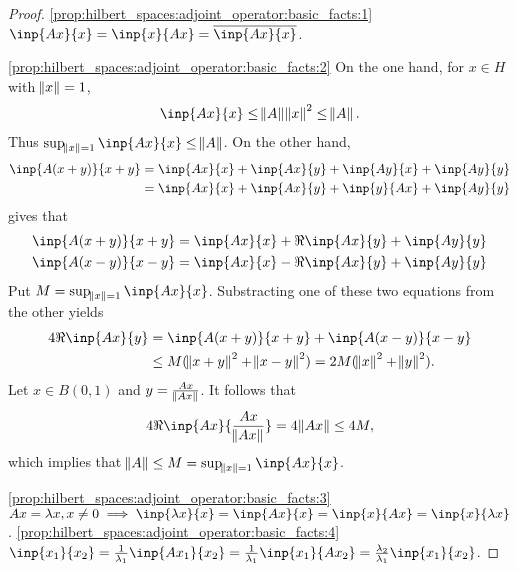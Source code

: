 \begin{proof}
\ref{prop:hilbert_spaces:adjoint_operator:basic_facts:1}
$\inp{Ax}{x} = \inp{x}{Ax} = \conj{\inp{Ax}{x}}$. 

\ref{prop:hilbert_spaces:adjoint_operator:basic_facts:2}
On the one hand, for $x \in H$ with $\norm{x} = 1$, 
\begin{equation*}
    \begin{aligned}
        \inp{Ax}{x} \le \norm{A} \norm{x}^2 \le \norm{A}. 
    \end{aligned}
\end{equation*}
Thus $\sup_{\norm{x} = 1} \inp{Ax}{x} \le \norm{A}$. 
On the other hand, 
\begin{equation}
    \begin{aligned}
        \inp{A(x + y)}{x + y} 
        &= \inp{Ax}{x} + \inp{Ax}{y} + \inp{Ay}{x} + \inp{Ay}{y} \\
        &= \inp{Ax}{x} + \inp{Ax}{y} + \inp{y}{Ax} + \inp{Ay}{y} 
    \end{aligned}
\end{equation}
gives that 
\begin{align}
    \inp{A(x + y)}{x + y} = \inp{Ax}{x} + \Re\inp{Ax}{y} + \inp{Ay}{y} \\
    \inp{A(x - y)}{x - y} = \inp{Ax}{x} - \Re\inp{Ax}{y} + \inp{Ay}{y}
\end{align}
Put $M = \sup_{\norm{x} = 1} \inp{Ax}{x}$. 
Substracting one of these two equations from the other yields 
\begin{equation*}
    \begin{aligned}
        4 \Re\inp{Ax}{y} 
        &= \inp{A(x + y)}{x + y} + \inp{A(x - y)}{x - y} \\
        &\le M(\norm{x + y}^2 + \norm{x - y}^2) 
        = 2 M(\norm{x} ^2 + \norm{y}^2). 
    \end{aligned}
\end{equation*}
Let $x \in B(0, 1)$ and $y = \frac{Ax}{\norm{Ax}}$. 
It follows that 
\begin{equation*}
    4 \Re \inp{Ax}{\frac{Ax}{\norm{Ax}}} = 4 \norm{A x} \le 4 M, 
\end{equation*}
which implies that $\norm{A} \le M = \sup_{\norm{x} = 1} \inp{Ax}{x}$. 

\ref{prop:hilbert_spaces:adjoint_operator:basic_facts:3}
$Ax = \lambda x, x \neq 0 \implies \inp{\lambda x}{x} = \inp{Ax}{x} = 
\inp{x}{Ax} = \inp{x}{\lambda x}$. 
\ref{prop:hilbert_spaces:adjoint_operator:basic_facts:4}
$\inp{x_1}{x_2} = \frac{1}{\lambda_1} \inp{Ax_1}{x_2} = \frac{1}{\lambda_1} 
\inp{x_1}{Ax_2} = \frac{\lambda_2}{\lambda_1} \inp{x_1}{x_2}$. 
\end{proof}